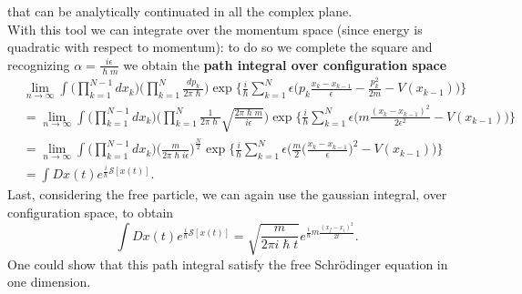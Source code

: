 that can be analytically continuated in all the complex plane.\\
With this tool we can integrate over the momentum space (since energy is quadratic with respect to momentum): to do so we complete the square and recognizing $\alpha=\frac{i\epsilon}{\hslash m}$ we obtain the \textbf{path integral over configuration space}
\begin{align*}
    &\lim_{n\rightarrow\infty}\int\bigg(\prod_{k=1}^{N-1}dx_k\bigg)\bigg(\prod_{k=1}^{N}\frac{dp_k}{2\pi\hslash}\bigg)\exp\bigg\{\frac{i}{\hslash}\sum_{k=1}^{N}\epsilon\bigg(p_k\frac{x_k-x_{k-1}}{\epsilon}-\frac{p_k^2}{2m}-V(x_{k-1})\bigg) \bigg\}\\&=\lim_{n\rightarrow\infty}\int\bigg(\prod_{k=1}^{N-1}dx_k\bigg)\bigg(\prod_{k=1}^{N}\frac{1}{2\pi\hslash}\sqrt{\frac{2\pi\hslash m}{i\epsilon}}\bigg)\exp\bigg\{\frac{i}{\hslash}\sum_{k=1}^{N}\epsilon\bigg(m\frac{(x_k-x_{k-1})^2}{2\epsilon^2}-V(x_{k-1})\bigg) \bigg\}\\&=\lim_{n\rightarrow\infty}\int\bigg(\prod_{k=1}^{N-1}dx_k\bigg)\bigg(\frac{m}{2\pi\hslash i\epsilon}\bigg)^{\frac{N}{2}}\exp\bigg\{\frac{i}{\hslash}\sum_{k=1}^{N}\epsilon\bigg(\frac{m}{2}\bigg(\frac{x_k-x_{k-1}}{\epsilon}\bigg)^2-V(x_{k-1})\bigg) \bigg\}\\&=\int Dx(t)e^{\frac{i}{\hslash}\mathcal{S} [x(t)]}.
\end{align*}
Last, considering the free particle, we can again use the gaussian integral, over configuration space, to obtain
\begin{equation*}
    \int Dx(t)e^{\frac{i}{\hslash}\mathcal{S} [x(t)]}=\sqrt{\frac{m}{2\pi i\hslash t}}e^{\frac{i}{\hslash}m\frac{(x_f-x_i)^2}{2t}}.
\end{equation*}
One could show that this path integral satisfy the free Schrödinger equation in one dimension.

